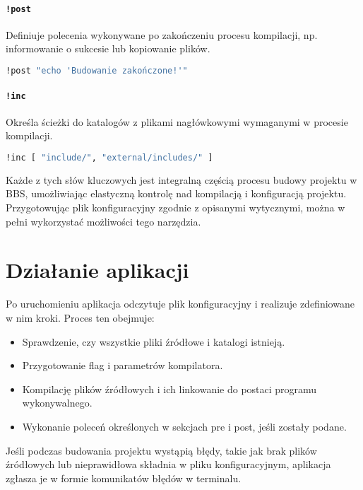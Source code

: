\paragraph{\texttt{!post}} Definiuje polecenia wykonywane po zakończeniu procesu kompilacji, np. informowanie o sukcesie lub kopiowanie plików.
\begin{lstlisting}[language=sh,alsoletter={!},keywords={!let,!prj,!files,!deps,!cflags,!pre,!post,!inc}]
!post "echo 'Budowanie zakończone!'"
\end{lstlisting}

\paragraph{\texttt{!inc}} Określa ścieżki do katalogów z plikami nagłówkowymi wymaganymi w procesie kompilacji.
\begin{lstlisting}[language=sh,alsoletter={!},keywords={!let,!prj,!files,!deps,!cflags,!pre,!post,!inc}]
!inc [ "include/", "external/includes/" ]
\end{lstlisting}

Każde z tych słów kluczowych jest integralną częścią procesu budowy projektu w BBS, umożliwiając elastyczną kontrolę nad kompilacją i konfiguracją projektu. Przygotowując plik konfiguracyjny zgodnie z opisanymi wytycznymi, można w pełni wykorzystać możliwości tego narzędzia.

\section{Działanie aplikacji}
Po uruchomieniu aplikacja odczytuje plik konfiguracyjny i realizuje zdefiniowane w nim kroki. Proces ten obejmuje:

\begin{itemize}
    \item Sprawdzenie, czy wszystkie pliki źródłowe i katalogi istnieją.
    \item Przygotowanie flag i parametrów kompilatora.
    \item Kompilację plików źródłowych i ich linkowanie do postaci programu wykonywalnego.
    \item Wykonanie poleceń określonych w sekcjach pre i post, jeśli zostały podane.
\end{itemize}

Jeśli podczas budowania projektu wystąpią błędy, takie jak brak plików źródłowych lub nieprawidłowa składnia w pliku konfiguracyjnym, aplikacja zgłasza je w formie komunikatów błędów w terminalu.